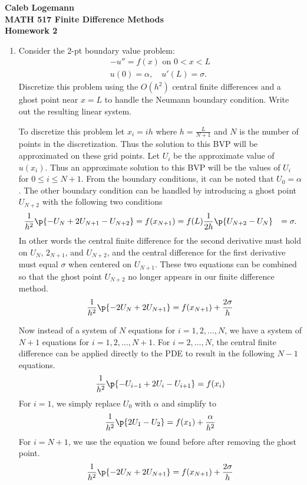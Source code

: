 \documentclass[11pt, oneside]{article}
\begin{document}
\noindent \textbf{\Large{Caleb Logemann \\
MATH 517 Finite Difference Methods \\
Homework 2
}}

%
\begin{enumerate}
    \item %
        Consider the 2-pt boundary value problem:
        \begin{align*}
            -u'' = f(x)\text{ on } 0 < x < L \\
            u(0) = \alpha, \quad u'(L) = \sigma.
        \end{align*}
        Discretize this problem using the $O(h^2)$ central finite differences
        and a ghost point near $x = L$ to handle the Neumann boundary condition.
        Write out the resulting linear system.

        To discretize this problem let $x_i = ih$ where $h = \frac{L}{N + 1}$
        and $N$ is the number of points in the discretization.
        Thus the solution to this BVP will be approximated on these grid points.
        Let $U_i$ be the approximate value of $u(x_i)$.
        Thus an approximate solution to this BVP will be the values of $U_i$ for
        $0 \le i \le N+1$.
        From the boundary conditions, it can be noted that $U_0 = \alpha$.
        The other boundary condition can be handled by introducing a ghost point
        $U_{N+2}$ with the following two conditions
        \begin{align*}
            \frac{1}{h^2}\p{-U_{N} + 2U_{N+1} - U_{N+2}} &= f(x_{N+1}) = f(L)
            \frac{1}{2h} \p{U_{N+2} - U_{N}} &= \sigma. \\
        \end{align*}
        In other words the central finite difference for the second derivative
        must hold on $U_{N}$, $2_{N+1}$, and $U_{N+2}$, and the central
        difference for the first derivative must equal $\sigma$ when centered
        on $U_{N+1}$.
        These two equations can be combined so that the ghost point $U_{N+2}$
        no longer appears in our finite difference method.
        \[
            \frac{1}{h^2}\p{-2U_N + 2U_{N+1}} = f(x_{N+1}) + \frac{2\sigma}{h}
        \]

        Now instead of a system of $N$ equations for $i = 1, 2, \ldots, N$,
        we have a system of $N+1$ equations for $i = 1, 2, \ldots, N+1$.
        For $i = 2, \ldots, N$, the central finite difference can be applied
        directly to the PDE to result in the following $N-1$ equations.
        \[
            \frac{1}{h^2}\p{-U_{i-1} + 2U_{i} - U_{i+1}} = f(x_i)
        \]
        For $i = 1$, we simply replace $U_0$ with $\alpha$ and simplify to
        \[
            \frac{1}{h^2}\p{2U_{1} - U_{2}} = f(x_1) + \frac{\alpha}{h^2}
        \]
        For $i = N + 1$, we use the equation we found before after removing
        the ghost point.
        \[
            \frac{1}{h^2}\p{-2U_N + 2U_{N+1}} = f(x_{N+1}) + \frac{2\sigma}{h}
        \]


\end{enumerate}
\end{document}
